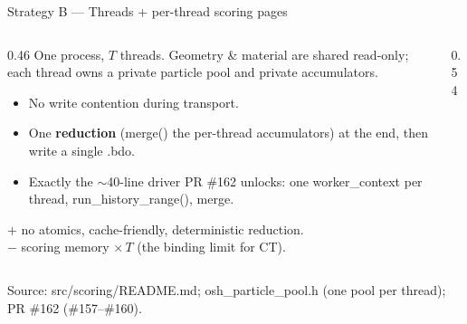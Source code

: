 \documentclass[aspectratio=169,10pt]{beamer}
\newcommand{\code}[1]{{\ttfamily\footnotesize #1}}
\begin{document}
\begin{frame}{Strategy B — Threads + per-thread scoring pages}
  \begin{columns}[T]
    \begin{column}{0.46\textwidth}
      \small
      One process, $T$ threads. Geometry \& material are
      \textcolor{oshGreen}{shared read-only}; each thread owns a
      \textcolor{oshAmber}{private particle pool and private accumulators}.
      \begin{itemize}\itemsep2pt
        \item No write contention during transport.
        \item One \textbf{reduction} (\code{merge()} the per-thread
              accumulators) at the end, then write a single \code{.bdo}.
        \item Exactly the $\sim$40-line driver PR \#162 unlocks: one
              \code{worker\_context} per thread, \code{run\_history\_range()},
              \code{merge}.
      \end{itemize}
      \textcolor{oshGreen}{$+$} no atomics, cache-friendly, deterministic
      reduction.\\
      \textcolor{oshRed}{$-$} scoring memory $\times\,T$ (the binding limit for CT).
    \end{column}
    \begin{column}{0.54\textwidth}
      \centering
    \end{column}
  \end{columns}
  \vspace{0.5mm}
  \footnotesize\color{oshGrey}
  Source: \code{src/scoring/README.md}; \code{osh\_particle\_pool.h} (one pool per thread); PR \#162 (\#157--\#160).
\end{frame}
\end{document}
